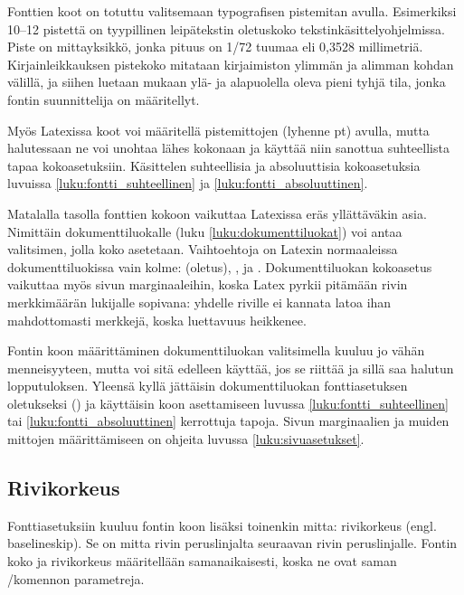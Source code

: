 Fonttien koot on totuttu valitsemaan typo\-grafisen pistemitan avulla.
Esimerkiksi 10--12 pistettä on tyypillinen leipätekstin oletuskoko
teks\-tin\-kä\-sit\-tely\-ohjel\-mis\-sa. Piste on mitta\-yksikkö, jonka
pituus on 1/72 tuumaa eli 0,3528 millimetriä. Kirjainleikkauksen
pistekoko mitataan kirjaimiston ylimmän ja alimman kohdan välillä, ja
siihen luetaan mukaan ylä- ja alapuolella oleva pieni tyhjä tila, jonka
fontin suunnittelija on määritellyt.

Myös Latexissa koot voi määritellä pistemittojen (lyhenne pt) avulla,
mutta halutessaan ne voi unohtaa lähes kokonaan ja käyttää niin sanottua
suhteellista tapaa koko\-asetuksiin. Käsittelen suhteellisia ja
absoluuttisia koko\-ase\-tuk\-sia luvuissa
\ref{luku:fontti_suhteellinen} ja \ref{luku:fontti_absoluuttinen}.

Matalalla tasolla fonttien kokoon vaikuttaa Latexissa eräs yllättäväkin
asia. Nimittäin dokumenttiluokalle (luku \ref{luku:dokumenttiluokat})
voi antaa valitsimen, jolla koko asetetaan. Vaihto\-ehtoja on Latexin
normaaleissa dokumenttiluokissa vain kolme: \koodi{10pt} (oletus),
\koodi{11pt}, ja \koodi{12pt}. Dokumenttiluokan koko\-asetus vaikuttaa
myös sivun marginaaleihin, koska Latex pyrkii pitämään rivin
merkkimäärän lukijalle sopivana: yhdelle riville ei kannata latoa ihan
mahdottomasti merkkejä, koska luettavuus heikkenee.

Fontin koon määrittäminen dokumenttiluokan valitsimella kuuluu jo vähän
menneisyyteen, mutta voi sitä edelleen käyttää, jos se riittää ja sillä
saa halutun lopputuloksen. Yleensä kyllä jättäisin dokumenttiluokan
fontti\-asetuksen oletukseksi (\koodi{10pt}) ja käyttäisin koon
asettamiseen luvussa \ref{luku:fontti_suhteellinen} tai
\ref{luku:fontti_absoluuttinen} kerrottuja tapoja. Sivun marginaalien ja
muiden mittojen määrittämiseen on ohjeita luvussa
\ref{luku:sivuasetukset}.

\subsection{Rivikorkeus}
\label{luku:fontti_rivikorkeus}

Fontti\-asetuksiin kuuluu fontin koon lisäksi toinenkin mitta:
rivikorkeus (engl. \textenglish{baselineskip}). Se on mitta rivin
peruslinjalta seuraavan rivin peruslinjalle. Fontin koko ja rivikorkeus
määritellään saman\-aikaisesti, koska ne ovat saman \-/komennon parametreja.

\begin{koodilohkosis}
  \fontsize{10pt}{12pt} \selectfont
\end{koodilohkosis}

